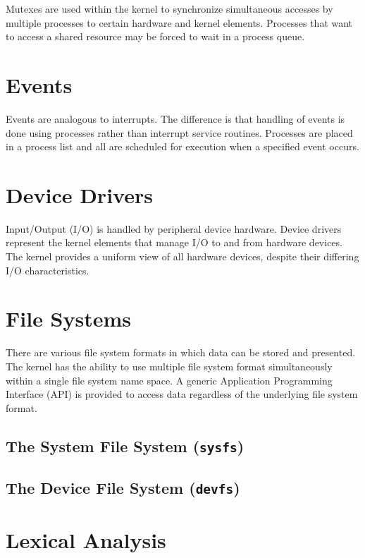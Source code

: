 Mutexes are used within the kernel to synchronize simultaneous
accesses by multiple processes to certain hardware and kernel
elements.  Processes that want to access a shared resource may
be forced to wait in a process queue.


\chapter{Events}

Events are analogous to interrupts.  The difference is that
handling of events is done using processes rather than interrupt
service routines.  Processes are placed in a process list and
all are scheduled for execution when a specified event occurs.


\chapter{Device Drivers}

Input/Output (I/O) is handled by peripheral device hardware.
Device drivers represent the kernel elements that manage I/O to
and from hardware devices.  The kernel provides a uniform view of
all hardware devices, despite their differing I/O characteristics.


\chapter{File Systems}

There are various file system formats in which data can be
stored and presented.  The kernel has the ability to use multiple
file system format simultaneously within a single file system
name space.  A generic Application Programming Interface (API)
is provided to access data regardless of the underlying file
system format.


\section{The System File System ({\tt sysfs})}


\section{The Device File System ({\tt devfs})}





\chapter{Lexical Analysis}

